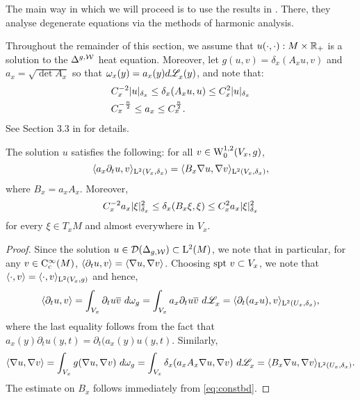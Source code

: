 \documentclass[a4paper, 12pt]{amsart}
\begin{document}
The main way in which we will proceed is to use the
results in \cite{CS}. There, they analyse
degenerate equations via the methods of harmonic analysis.

Throughout the remainder of this section,
we assume that $u(\cdot, \cdot): M \times \R_+$ 
is a solution to the $\Delta^{g,\cW}$ heat equation.
Moreover, let $g(u,v) = \delta_x(A_x u,v)$
and $a_x = \sqrt{\det A_x}$ so that
$\omega_x(y) = a_x(y)d\Leb_x(y)$, and note
that:
\begin{equation}
\label{eq:constbd}
\begin{split}
&C_x^{-2} \modulus{u}_{\delta_x} \leq \delta_x(A_x u, u) \leq C_x^2 \modulus{u}_{\delta_x} \\
&C_x^{-\frac{n}{2}} \leq a_x \leq C_x^{\frac{n}{2}}.
\end{split}
\end{equation}
See Section 3.3 in \cite{BRough} for details. 

\begin{lemma}
\label{eq:soln1}
The solution $u$ satisfies the following: for all $v \in \SobH[0]{1}(V_x,g)$, 
	\begin{equation} 
	\label{eq:testfn1}	 
	\inprod{a_x \partial_t u, v}_{\Lp{2}(V_x, \delta_x)} 
		= \inprod{ B_x \nabla u, \nabla v}_{\Lp{2}(V_x, \delta_x)},
	\end{equation}
where $B_x = a_x A_x$. Moreover,
\begin{equation}
\label{eq:coeff}
C_x^{-2} a_x \modulus{\xi}_{\delta_x}^2 \leq \delta_x(B_x \xi, \xi) 
	\leq C_x^2 a_x \modulus{\xi}_{\delta_x}^2
\end{equation} 
for every $\xi \in T_xM$ and almost everywhere in $V_x$. 
\end{lemma}
\begin{proof}
Since the solution $u \in \dom(\Delta_{g,\cW}) \subset \Lp{2}(M)$, we
note that in particular, for any $v \in \Ck[c]{\infty}(M)$, 
$\inprod{\partial_t u, v} = \inprod{\nabla u, \nabla v}$.
Choosing $\spt v \subset V_x$, we note that $\inprod{\cdot, v} = \inprod{\cdot, v}_{\Lp{2}(V_x,g)}$
and hence,
$$\inprod{\partial_t u, v} = \int_{V_x} \partial_t u\conj{v}\ d\omega_g 
	= \int_{V_x} a_x \partial_t  u \conj{v}\ d\Leb_x
	= \inprod{\partial_t (a_x u), v}_{\Lp{2}(U_x, \delta_x)},$$
where the last equality follows from the fact that 
$a_x(y) \partial_t u(y,t) = \partial_t (a_x(y)u(y,t).$
Similarly,
$$\inprod{\nabla u, \nabla v} 
	= \int_{V_x} g(\nabla u, \nabla v)\ d\omega_g
	= \int_{V_x} \delta_x(a_x A_x \nabla u, \nabla v)\ d\Leb_x
	= \inprod{B_x \nabla u, \nabla v}_{\Lp{2}(U_x, \delta_x)}.$$
The estimate on $B_x$ follows immediately from
\eqref{eq:constbd}.
\end{proof} 
\end{document}

